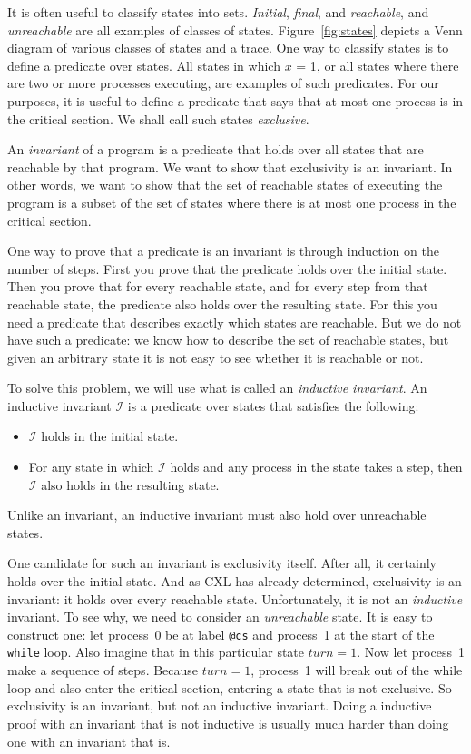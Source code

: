 \documentclass{report}
\begin{document}
It is often useful to classify states into sets.
\emph{Initial}, \emph{final}, and \emph{reachable}, and \emph{unreachable}
are all examples of classes of states.
Figure~\ref{fig:states} depicts a Venn diagram of various classes of states
and a trace.
One way to classify states is to define a predicate over states.
All states in which $x$ = 1, or all states where
there are two or more processes executing, are examples of such predicates.
For our purposes, it is useful to define a predicate that says that at
most one process is in the critical section.  We shall call such states
\emph{exclusive}.

An \emph{invariant} of a program
is a predicate that holds over all states that are reachable by that program.
We want to show that exclusivity is an invariant.
In other words, we want to show that the set of reachable states of executing
the program
is a subset of the set of states where there is at most one process in the critical
section.

One way to prove that a predicate is an invariant is through induction
on the number of steps.  First you prove that the predicate holds over
the initial state.  Then you prove that for every reachable state,
and for every step from that reachable state, the predicate also holds
over the resulting state.
For this you need a predicate that describes exactly which
states are reachable.
But we do not have such a predicate: we know how to describe the set
of reachable states, but given an arbitrary state it is not easy to
see whether it is reachable or not.

To solve this problem, we will use what is called an
\emph{inductive invariant}.
An inductive invariant $\mathcal{I}$ is a predicate over states that satisfies the following:
\begin{itemize}
\item $\mathcal{I}$ holds in the initial state.
\item For any state in which $\mathcal{I}$ holds and any process in the
state takes a step, then $\mathcal{I}$ also holds in the resulting state.
\end{itemize}
Unlike an invariant, an inductive invariant must also hold over unreachable states.

One candidate for such an invariant is exclusivity itself.
After all, it certainly holds over the initial state.
And as CXL has already determined, exclusivity is an invariant:
it holds over every reachable state.
Unfortunately, it is not an \emph{inductive} invariant.
To see why, we need to consider an \emph{unreachable} state.
It is easy to construct one: let process~0 be at label \texttt{@cs}
and process~1 at the start of the \texttt{while} loop.
Also imagine that in this particular state $\mathit{turn} = 1$.  Now let
process~1 make a sequence of steps.  Because $\mathit{turn} = 1$,
process~1 will break out of the while loop and also enter the critical
section, entering a state that is not exclusive.
So exclusivity is an invariant, but not an inductive invariant.
Doing a inductive proof with an invariant that is not inductive is usually
much harder than doing one with an invariant that is.
\end{document}
